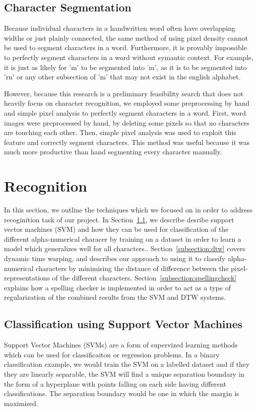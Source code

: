 \documentclass[12pt]{article}
\begin{document}
	\subsection{Character Segmentation}
		Because individual characters in a handwritten word often have overlapping widths or just plainly connected, the same method of using pixel density cannot be used to segment characters in a word. Furthermore, it is provably impossible to perfectly segment characters in a word without symantic context. For example, it is just as likely for 'm' to be segmented into 'm', as it is to be segmented into 'rn' or any other subsection of 'm' that may not exist in the english alphabet.
		
		However, because this research is a preliminary feasibility search that does not heavily focus on character recognition, we employed some preprocessing by hand and simple pixel analysis to perfectly segment characters in a word. First, word images were preprocessed by hand, by deleting some pixels so that no characters are touching each other. Then, simple pixel analysis was used to exploit this feature and correctly segment characters. This method was useful because it was much more productive than hand segmenting every character manually.

			
\section{Recognition}
\label{section:recognition}
	In this section, we outline the techniques which we focused on in order to address recoginition task of our project. In Section~\ref{subsection:svm}, we describe desribe support vector machines (SVM) and how they can be used for classification of the different alpha-numerical characer by training on a dataset in order to learn a model which generalizes well for all characters.. Section~\ref{subsection:dtw} covers dynamic time warping, and describes our approach to using it to classify alpha-numerical characters by minimising the distance of difference between the pixel-representations of the different characters. Section~\ref{subsection:spellingcheck} explains how a spelling checker is implemented in order to act as a type of regularization of the combined results from the SVM and DTW systems.

	\subsection{Classification using Support Vector Machines}	
	\label{subsection:svm}
	Support Vector Machines (SVMs) are a form of supervized learning methods which can be used for classificaiton or regression problems. In a binary classification example, we would train the SVM on a labelled dataset and if they they are linearly separable, the SVM will find a unique separation boundary in the form of a hyperplane with points falling on each side having different classifications. The separation boundary would be one in which the margin is maximised. 
\end{document}

